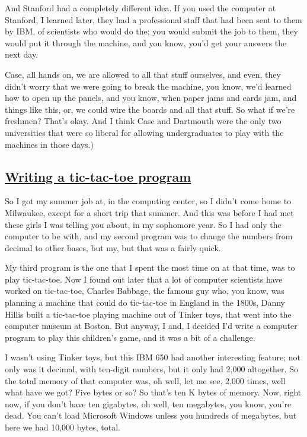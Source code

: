 \documentclass[]{article}
\begin{document}
And Stanford had a completely different idea. If you used the computer
at Stanford, I learned later, they had a professional staff that had
been sent to them by IBM, of scientists who would do the; you would
submit the job to them, they would put it through the machine, and you
know, you'd get your answers the next day.

Case, all hands on, we are allowed to all that stuff ourselves, and
even, they didn't worry that we were going to break the machine, you
know, we'd learned how to open up the panels, and you know, when paper
jams and cards jam, and things like this, or, we could wire the boards
and all that stuff. So what if we're freshmen? That's okay. And I think
Case and Dartmouth were the only two universities that were so liberal
for allowing undergraduates to play with the machines in those days.)

\subsection{\texorpdfstring{\href{http://webofstories.com/play/17081}{Writing
a tic-tac-toe
program}}{Writing a tic-tac-toe program}}\label{writing-a-tic-tac-toe-program}

So I got my summer job at, in the computing center, so I didn't come
home to Milwaukee, except for a short trip that summer. And this was
before I had met these girls I was telling you about, in my sophomore
year. So I had only the computer to be with, and my second program was
to change the numbers from decimal to other bases, but my, but that was
a fairly quick.

My third program is the one that I spent the most time on at that time,
was to play tic-tac-toe. Now I found out later that a lot of computer
scientists have worked on tic-tac-toe, Charles Babbage, the famous guy
who, you know, was planning a machine that could do tic-tac-toe in
England in the 1800s, Danny Hillis built a tic-tac-toe playing machine
out of Tinker toys, that went into the computer museum at Boston. But
anyway, I and, I decided I'd write a computer program to play this
children's game, and it was a bit of a challenge.

I wasn't using Tinker toys, but this IBM 650 had another interesting
feature; not only was it decimal, with ten-digit numbers, but it only
had 2,000 altogether. So the total memory of that computer was, oh well,
let me see, 2,000 times, well what have we got? Five bytes or so? So
that's ten K bytes of memory. Now, right now, if you don't have ten
gigabytes, oh well, ten megabytes, you know, you're dead. You can't load
Microsoft Windows unless you hundreds of megabytes, but here we had
10,000 bytes, total.
\end{document}
